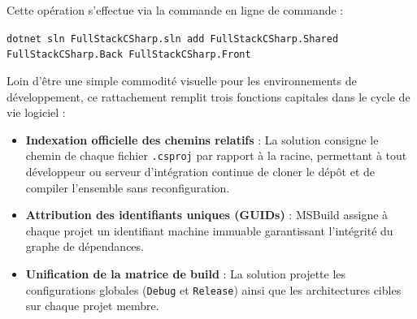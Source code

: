 \documentclass[a4paper,11pt]{report}
\begin{document}
Cette opération s'effectue via la commande en ligne de commande :
\begin{center}
\texttt{dotnet sln FullStackCSharp.sln add FullStackCSharp.Shared FullStackCSharp.Back FullStackCSharp.Front}
\end{center}

Loin d'être une simple commodité visuelle pour les environnements de développement, ce rattachement remplit trois fonctions capitales dans le cycle de vie logiciel :
\begin{itemize}
    \item \textbf{Indexation officielle des chemins relatifs} : La solution consigne le chemin de chaque fichier \texttt{.csproj} par rapport à la racine, permettant à tout développeur ou serveur d'intégration continue de cloner le dépôt et de compiler l'ensemble sans reconfiguration.
    \item \textbf{Attribution des identifiants uniques (GUIDs)} : MSBuild assigne à chaque projet un identifiant machine immuable garantissant l'intégrité du graphe de dépendances.
    \item \textbf{Unification de la matrice de build} : La solution projette les configurations globales (\texttt{Debug} et \texttt{Release}) ainsi que les architectures cibles sur chaque projet membre.
\end{itemize}

\vspace{0.3cm}
\end{document}

